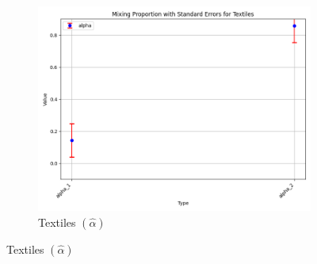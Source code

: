 \documentclass{article}
\begin{document}
\begin{figure}[ht!]
\begin{subfigure}[t]{0.32\textwidth}
    \end{subfigure}
    \begin{subfigure}[t]{0.32\textwidth}
        \centering
        \includegraphics[width=\textwidth]{figure/empirical_ar1_normal_alpha_with_error_bars_Textiles.png}
        \caption{Textiles $(\hat\alpha)$}
    \end{subfigure}


\end{figure}
\end{document}
